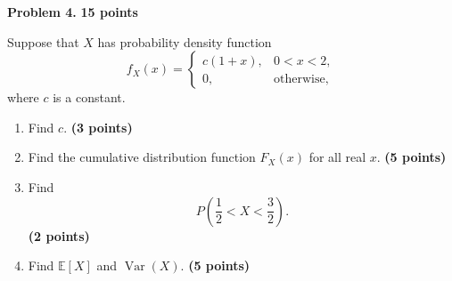 \documentclass[11pt]{article}
\begin{document}
\newpage


\begin{problemheader}
\textbf{Problem 4.} \hfill \textbf{15 points}
\end{problemheader}

Suppose that $X$ has probability density function
\[
f_X(x)=
\begin{cases}
c(1+x), & 0<x<2,\\
0, & \text{otherwise},
\end{cases}
\]
where $c$ is a constant.

\begin{enumerate}[label=(\alph*),leftmargin=*,itemsep=0.8em]

    \item Find $c$.
    \hfill \textbf{(3 points)}

    \item Find the cumulative distribution function $F_X(x)$
    for all real $x$.
    \hfill \textbf{(5 points)}

    \item Find
    \[
    P\left(\frac12<X<\frac32\right).
    \]
    \hfill \textbf{(2 points)}

    \item Find $\mathbb{E}[X]$ and $\operatorname{Var}(X)$.
    \hfill \textbf{(5 points)}

\end{enumerate}
\end{document}
